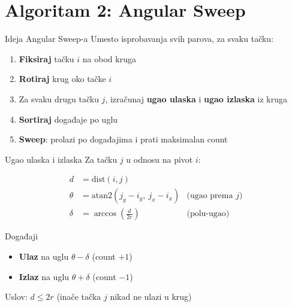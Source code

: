 \documentclass{beamer}
\begin{document}
\section{Algoritam 2: Angular Sweep}

\begin{frame}{Ideja Angular Sweep-a}
Umesto isprobavanja svih parova, za svaku tačku:

\begin{enumerate}
    \item \textbf{Fiksiraj} tačku $i$ na obod kruga
    \item \textbf{Rotiraj} krug oko tačke $i$
    \item Za svaku drugu tačku $j$, izračunaj \textbf{ugao ulaska} i \textbf{ugao izlaska} iz kruga
    \item \textbf{Sortiraj} događaje po uglu
    \item \textbf{Sweep}: prolazi po događajima i prati maksimalan count
\end{enumerate}

\vspace{10pt}

\begin{center}
\end{center}
\end{frame}

\begin{frame}{Ugao ulaska i izlaska}
Za tačku $j$ u odnosu na pivot $i$:

\vspace{6pt}

\begin{align*}
d &= \text{dist}(i, j)\\[4pt]
\theta &= \text{atan2}(j_y - i_y,\ j_x - i_x) & \text{(ugao prema $j$)}\\[4pt]
\delta &= \arccos\left(\frac{d}{2r}\right) & \text{(polu-ugao)}
\end{align*}

\vspace{6pt}

\begin{block}{Događaji}
\begin{itemize}
    \item \textbf{Ulaz} na uglu $\theta - \delta$ \quad (count $+1$)
    \item \textbf{Izlaz} na uglu $\theta + \delta$ \quad (count $-1$)
\end{itemize}
\end{block}

\vspace{6pt}

Uslov: $d \leq 2r$ (inače tačka $j$ nikad ne ulazi u krug)
\end{frame}
\end{document}
